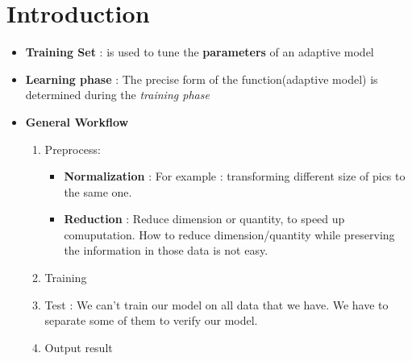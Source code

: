 \documentclass[12pt]{article}
\begin{document}
\section {Introduction}
\begin{itemize}
\item \textbf{Training Set} : is used to tune the \textbf{parameters} of an adaptive model
\item \textbf{Learning phase} : The precise form of the function(adaptive model) is determined during the \emph{training phase}

\item \textbf{General Workflow}
	\begin{enumerate}
		\item Preprocess:
			\begin{itemize}
				\item \textbf{Normalization} : For example : transforming different size of pics to the same one.
				\item \textbf{Reduction} : Reduce dimension or quantity, to speed up comuputation. How to reduce dimension/quantity while preserving the information in those data is not easy.
			\end{itemize}
		\item Training
		\item Test : We can't train our model on all data that we have. We have to separate some of them to verify our model.
		\item Output result
	\end{enumerate}
\end{itemize}
\end{document}

